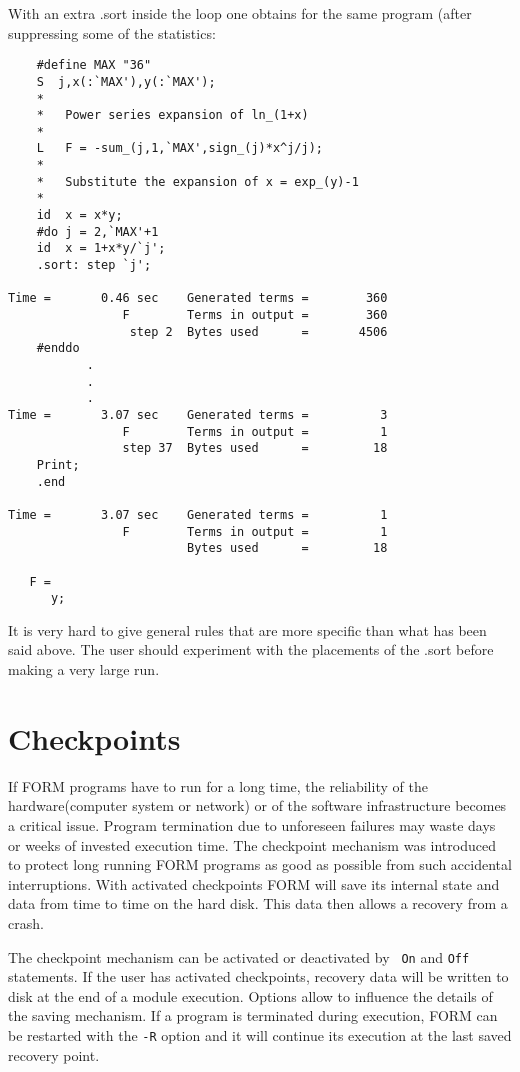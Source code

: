 With an extra .sort inside the loop one obtains for the same program (after 
suppressing some of the statistics:
\begin{verbatim}
    #define MAX "36"
    S  j,x(:`MAX'),y(:`MAX');
    *
    *	Power series expansion of ln_(1+x)
    *
    L	F = -sum_(j,1,`MAX',sign_(j)*x^j/j);
    *
    *	Substitute the expansion of x = exp_(y)-1
    *
    id	x = x*y;
    #do j = 2,`MAX'+1
    id	x = 1+x*y/`j';
    .sort: step `j';

Time =       0.46 sec    Generated terms =        360
                F        Terms in output =        360
                 step 2  Bytes used      =       4506
    #enddo
           .
           .
           .
Time =       3.07 sec    Generated terms =          3
                F        Terms in output =          1
                step 37  Bytes used      =         18
    Print;
    .end

Time =       3.07 sec    Generated terms =          1
                F        Terms in output =          1
                         Bytes used      =         18

   F =
      y;
\end{verbatim}
It is very hard to give general rules that are more specific than what has 
been said above. The user should experiment with the placements of the .sort 
before making a very large run. 

\section{Checkpoints}
\label{checkpoints}

If FORM programs have to run for a long time, the 
reliability of the hardware(computer system or network) or of the software 
infrastructure becomes a critical issue. Program 
termination due to unforeseen failures may waste days or 
weeks of invested execution time. The checkpoint mechanism was introduced 
to protect long running FORM programs as good as possible from such 
accidental interruptions. With activated checkpoints FORM will save its 
internal state and data from time to time on the hard disk. This data then 
allows a recovery from a crash.

The checkpoint mechanism can be activated or deactivated by {\tt 
On} and {\tt Off} statements. If the user has 
activated checkpoints, recovery data will be written to disk 
at the end of a module execution. Options allow to influence the details of 
the saving mechanism. If a program is terminated during execution, FORM can 
be restarted with the {\tt -R} option and it will continue its execution at 
the last saved recovery point.

